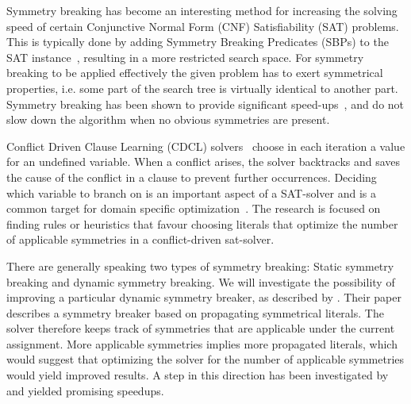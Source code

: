 Symmetry breaking has become an interesting method for increasing the solving speed of
certain Conjunctive Normal Form (CNF) Satisfiability (SAT) problems.
This is typically done by adding Symmetry Breaking Predicates (SBPs) to the SAT
instance~\cite{sakallah2009symmetry}, resulting in a more restricted search space.
For symmetry breaking to be applied effectively the given problem has to exert symmetrical
properties, i.e. some part of the search tree is virtually identical to another part.
Symmetry breaking has been shown to provide significant
speed-ups~\cite{darga2004exploiting,aloul2003solving}, and do not slow down the algorithm
when no obvious symmetries are present.

Conflict Driven Clause Learning (CDCL) solvers~\cite{marques1999grasp} choose in each iteration a value for an undefined variable.
When a conflict arises, the solver backtracks
and saves the cause of the conflict in a clause to prevent further occurrences.
Deciding which variable to branch on is an important aspect of a SAT-solver and is a common target
for domain specific optimization~\cite{een2004extensible}.
The research is focused on finding rules or heuristics that favour choosing literals
that optimize the number of applicable symmetries in a conflict-driven sat-solver.

There are generally speaking two types of symmetry breaking: Static symmetry breaking and
dynamic symmetry breaking.
We will investigate the possibility of improving a particular dynamic symmetry breaker, as described
by \cite{devriendt2012symmetry}.
Their paper describes a symmetry breaker based on propagating symmetrical literals.
The solver therefore keeps track of symmetries that are applicable under the current assignment.
More applicable symmetries implies more propagated literals, which would suggest that
optimizing the solver for the number of applicable symmetries would yield improved results.
A step in this direction has been investigated by \cite{devriendt2012symmetry} and yielded
promising speedups.
